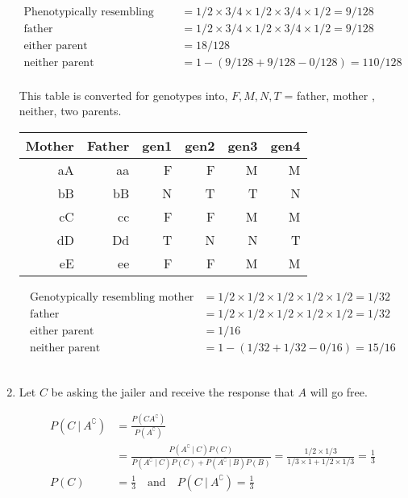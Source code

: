 \begin{enumerate}
	
		\begin{align}
			\text{Phenotypically resembling mother} &=  1/2 \times 3/4 \times 1/2 \times 3/4 \times 1/2  = 9/128\\
			\text{father} &=  1/2 \times 3/4 \times 1/2 \times 3/4 \times 1/2  = 9/128\\
			\text{either parent} &=  18/128 \\
			\text{neither parent} &=  1 - (9 / 128 + 9 / 128 - 0/128) = 110/128
		\end{align}
	\\
	This table is converted for genotypes into, $ F, M, N, T $ = father, mother , neither, two parents.
	
	\begin{table}[H]
		\centering
		\begin{tabular}{@{}rr|rrrr@{}}
			\toprule
			Mother & Father & gen1 & gen2 & gen3 & gen4 \\ \midrule
			aA     & aa		& F	 & F 	  & M 	   & M   \\
			bB     & bB     & N	 & T 	  & T 	   & N    \\
			cC     & cc     & F	 & F 	  & M 	   & M    \\
			dD     & Dd     & T	 & N 	  & N 	   & T    \\
			eE     & ee     & F	 & F 	  & M 	   & M    \\ \bottomrule
		\end{tabular}
	\end{table}
	
	
		\begin{align}
			\text{Genotypically resembling mother} &=  1/2 \times 1/2 \times 1/2 \times 1/2 \times 1/2  = 1/32\\
			\text{father} &=   1/2 \times 1/2 \times 1/2 \times 1/2 \times 1/2  = 1/32\\
			\text{either parent} &=  1/16 \\
			\text{neither parent} &=  1 - (1/32 + 1/32 - 0/16) = 15/16
		\end{align}
	\\
	
	\item Let $ C $ be asking the jailer and receive the response that $ A $ will go free. 
	
		\begin{align}
			P(C\ |\ A^\complement) &= \frac{P(C A^\complement)}{P(A^\complement)} \\
			& = \frac{P(A^\complement\ |\ C) P(C)}{P(A^\complement\ |\ C) P(C) +P(A^\complement\ |\ B) P(B)}  = \frac{1/2 \times 1/3}{1/3 \times 1 + 1/2 \times 1/3} = \frac{1}{3}\\
			P(C) &= \frac{1}{3} \quad \text{and} \quad P(C\ |\ A^\complement) = \frac{1}{3}
		\end{align}
	

\end{enumerate}
